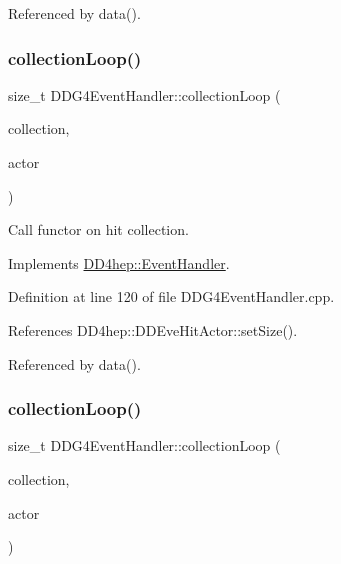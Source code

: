 Referenced by data().

\hypertarget{class_d_d4hep_1_1_d_d_g4_event_handler_a65645df58f694dea050f7d57d353dff4}{}\label{class_d_d4hep_1_1_d_d_g4_event_handler_a65645df58f694dea050f7d57d353dff4} 
\subsubsection{\texorpdfstring{collection\+Loop()}{collectionLoop()}\hspace{0.1cm}{\footnotesize\ttfamily [1/2]}}
{\footnotesize\ttfamily size\+\_\+t D\+D\+G4\+Event\+Handler\+::collection\+Loop (\begin{DoxyParamCaption}\item[{const std\+::string \&}]{collection,  }\item[{\hyperlink{struct_d_d4hep_1_1_d_d_eve_hit_actor}{D\+D\+Eve\+Hit\+Actor} \&}]{actor }\end{DoxyParamCaption})\hspace{0.3cm}{\ttfamily [virtual]}}



Call functor on hit collection. 



Implements \hyperlink{class_d_d4hep_1_1_event_handler_a454baeb81b675f3ebd8bb4293064b787}{D\+D4hep\+::\+Event\+Handler}.



Definition at line 120 of file D\+D\+G4\+Event\+Handler.\+cpp.



References D\+D4hep\+::\+D\+D\+Eve\+Hit\+Actor\+::set\+Size().



Referenced by data().

\hypertarget{class_d_d4hep_1_1_d_d_g4_event_handler_a9f45863ae9406f8d5ec1d309321c50d6}{}\label{class_d_d4hep_1_1_d_d_g4_event_handler_a9f45863ae9406f8d5ec1d309321c50d6} 
\subsubsection{\texorpdfstring{collection\+Loop()}{collectionLoop()}\hspace{0.1cm}{\footnotesize\ttfamily [2/2]}}
{\footnotesize\ttfamily size\+\_\+t D\+D\+G4\+Event\+Handler\+::collection\+Loop (\begin{DoxyParamCaption}\item[{const std\+::string \&}]{collection,  }\item[{\hyperlink{struct_d_d4hep_1_1_d_d_eve_particle_actor}{D\+D\+Eve\+Particle\+Actor} \&}]{actor }\end{DoxyParamCaption})\hspace{0.3cm}{\ttfamily [virtual]}}



